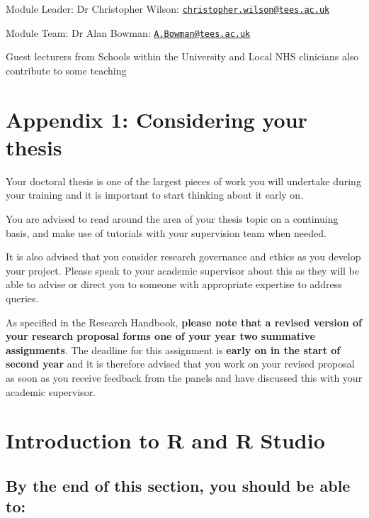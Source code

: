 \documentclass[
]{book}
\begin{document}
Module Leader: Dr Christopher Wilson: \href{mailto:christopher.wilson@tees.ac.uk}{\nolinkurl{christopher.wilson@tees.ac.uk}}

Module Team: Dr Alan Bowman: \href{mailto:A.Bowman@tees.ac.uk}{\nolinkurl{A.Bowman@tees.ac.uk}}

Guest lecturers from Schools within the University and Local NHS clinicians also contribute to some teaching

\hypertarget{appendix-1-considering-your-thesis}{%
\chapter{Appendix 1: Considering your thesis}\label{appendix-1-considering-your-thesis}}

Your doctoral thesis is one of the largest pieces of work you will undertake during your training and it is important to start thinking about it early on.

You are advised to read around the area of your thesis topic on a continuing basis, and make use of tutorials with your supervision team when needed.

It is also advised that you consider research governance and ethics as you develop your project. Please speak to your academic supervisor about this as they will be able to advise or direct you to someone with appropriate expertise to address queries.

As specified in the Research Handbook, \textbf{please note that a revised version of your research proposal forms one of your year two summative assignments}. The deadline for this assignment is \textbf{early on in the start of second year} and it is therefore advised that you work on your revised proposal as soon as you receive feedback from the panels and have discussed this with your academic supervisor.

\hypertarget{introduction-to-r-and-r-studio}{%
\chapter{Introduction to R and R Studio}\label{introduction-to-r-and-r-studio}}

\hypertarget{by-the-end-of-this-section-you-should-be-able-to}{%
\section{By the end of this section, you should be able to:}\label{by-the-end-of-this-section-you-should-be-able-to}}
\end{document}
